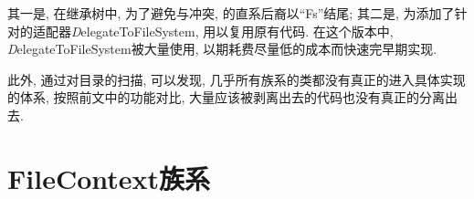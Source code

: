 其一是, 在继承树中, 为了避免与{\FiS}冲突, {\AbsFS}的直系后裔以``Fs''结尾;
其二是, 为{\AbsFS}添加了针对{\FiS}的适配器{\emph DelegateToFileSystem},
用以复用原有代码. 在这个版本中, {\emph DelegateToFileSystem}被大量使用,
以期耗费尽量低的成本而快速完早期实现.

此外, 通过对目录的扫描, 可以发现, 几乎所有{\AbsFS}族系的类都没有真正的进入具体实现的体系,
按照前文中的功能对比, 大量应该被剥离出去的代码也没有真正的分离出去.

\section{FileContext族系}
\label{sec:hfs:fc}
